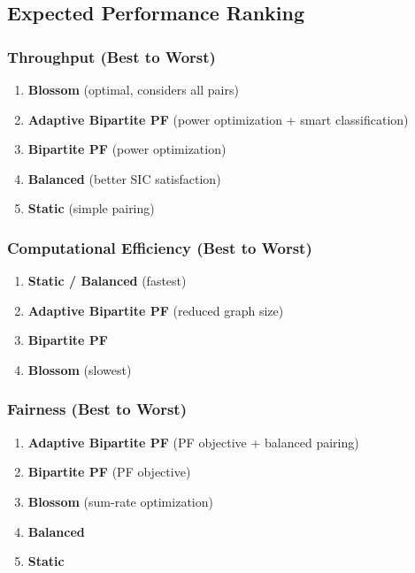 \documentclass[12pt,a4paper]{article}
\begin{document}
\subsection{Expected Performance Ranking}

\subsubsection{Throughput (Best to Worst)}

\begin{enumerate}
    \item \textbf{Blossom} (optimal, considers all pairs)
    \item \textbf{Adaptive Bipartite PF} (power optimization + smart classification)
    \item \textbf{Bipartite PF} (power optimization)
    \item \textbf{Balanced} (better SIC satisfaction)
    \item \textbf{Static} (simple pairing)
\end{enumerate}

\subsubsection{Computational Efficiency (Best to Worst)}

\begin{enumerate}
    \item \textbf{Static / Balanced} (fastest)
    \item \textbf{Adaptive Bipartite PF} (reduced graph size)
    \item \textbf{Bipartite PF}
    \item \textbf{Blossom} (slowest)
\end{enumerate}

\subsubsection{Fairness (Best to Worst)}

\begin{enumerate}
    \item \textbf{Adaptive Bipartite PF} (PF objective + balanced pairing)
    \item \textbf{Bipartite PF} (PF objective)
    \item \textbf{Blossom} (sum-rate optimization)
    \item \textbf{Balanced}
    \item \textbf{Static}
\end{enumerate}
\end{document}

